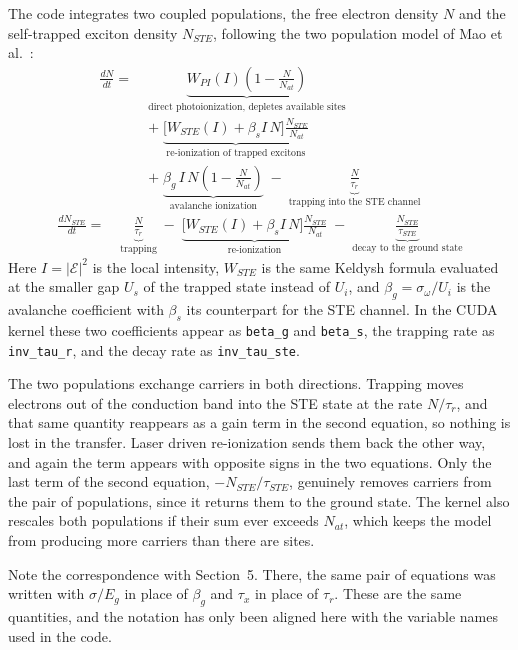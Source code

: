 The code integrates two coupled populations, the free electron density $N$ and the self-trapped exciton density $N_{STE}$, following the two population model of Mao et al.~\cite{mao2004}:
\begin{align}
\frac{dN}{dt} =\;
&\underbrace{W_{PI}(I)\left(1-\frac{N}{N_{at}}\right)}_{\text{direct photoionization, depletes available sites}} \nonumber\\[4pt]
&+\;\underbrace{\Big[W_{STE}(I)+\beta_s I\, N\Big]\frac{N_{STE}}{N_{at}}}_{\text{re-ionization of trapped excitons}} \nonumber\\[4pt]
&+\;\underbrace{\beta_g\, I\, N\left(1-\frac{N}{N_{at}}\right)}_{\text{avalanche ionization}}
\;-\;\underbrace{\frac{N}{\tau_r}}_{\text{trapping into the STE channel}}
\end{align}
\begin{align}
\frac{dN_{STE}}{dt} =\;
&\underbrace{\frac{N}{\tau_r}}_{\text{trapping}}
\;-\;\underbrace{\Big[W_{STE}(I)+\beta_s I\, N\Big]\frac{N_{STE}}{N_{at}}}_{\text{re-ionization}}
\;-\;\underbrace{\frac{N_{STE}}{\tau_{STE}}}_{\text{decay to the ground state}}
\end{align}
Here $I=|\mathcal{E}|^2$ is the local intensity, $W_{STE}$ is the same Keldysh formula evaluated at the smaller gap $U_s$ of the trapped state instead of $U_i$, and $\beta_g=\sigma_\omega/U_i$ is the avalanche coefficient with $\beta_s$ its counterpart for the STE channel. In the CUDA kernel these two coefficients appear as \texttt{beta\_g} and \texttt{beta\_s}, the trapping rate as \texttt{inv\_tau\_r}, and the decay rate as \texttt{inv\_tau\_ste}.

The two populations exchange carriers in both directions. Trapping moves electrons out of the conduction band into the STE state at the rate $N/\tau_r$, and that same quantity reappears as a gain term in the second equation, so nothing is lost in the transfer. Laser driven re-ionization sends them back the other way, and again the term appears with opposite signs in the two equations. Only the last term of the second equation, $-N_{STE}/\tau_{STE}$, genuinely removes carriers from the pair of populations, since it returns them to the ground state. The kernel also rescales both populations if their sum ever exceeds $N_{at}$, which keeps the model from producing more carriers than there are sites.

Note the correspondence with Section~5. There, the same pair of equations was written with $\sigma/E_g$ in place of $\beta_g$ and $\tau_x$ in place of $\tau_r$. These are the same quantities, and the notation has only been aligned here with the variable names used in the code.

